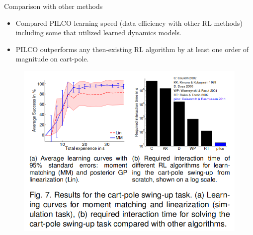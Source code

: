 \documentclass{beamer}
\begin{document}
\begin{frame}{Comparison with other methods}
	\begin{minipage}{0.5\textwidth}
		\begin{itemize}
			\item Compared PILCO learning speed (data efficiency with other RL methods) including some that utilized learned dynamics models.
			\item PILCO outperforms any then-existing RL algorithm by at least one order of magnitude on cart-pole.
		\end{itemize}
	\end{minipage}\hfill
	\begin{minipage}{0.45\textwidth}
	\begin{figure}[H]
		\centering
		\includegraphics[width=\linewidth]{./results_chart.png}
	\end{figure}
	\end{minipage}
\end{frame}
\end{document}
